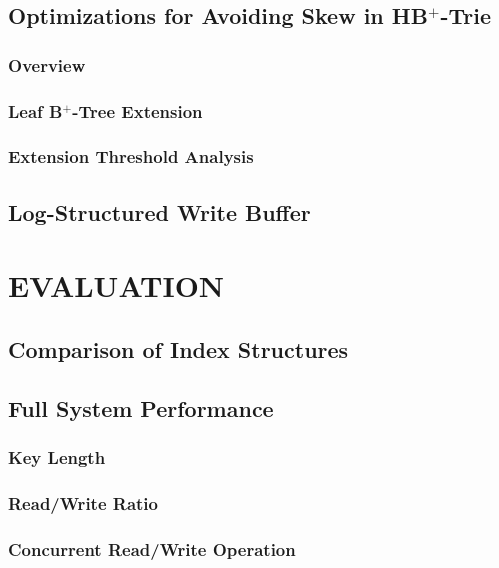 \documentclass[lang=cn]{cls/elegantpaper}
\begin{document}
\subsection{Optimizations for Avoiding Skew in HB$^+$-Trie}

\subsubsection{Overview}

\subsubsection{Leaf B$^+$-Tree Extension}

\subsubsection{Extension Threshold Analysis}

\subsection{Log-Structured Write Buffer}

\section{EVALUATION}

\subsection{Comparison of Index Structures}

\subsection{Full System Performance}

\subsubsection{Key Length}

\subsubsection{Read/Write Ratio}

\subsubsection{Concurrent Read/Write Operation}
\end{document}
